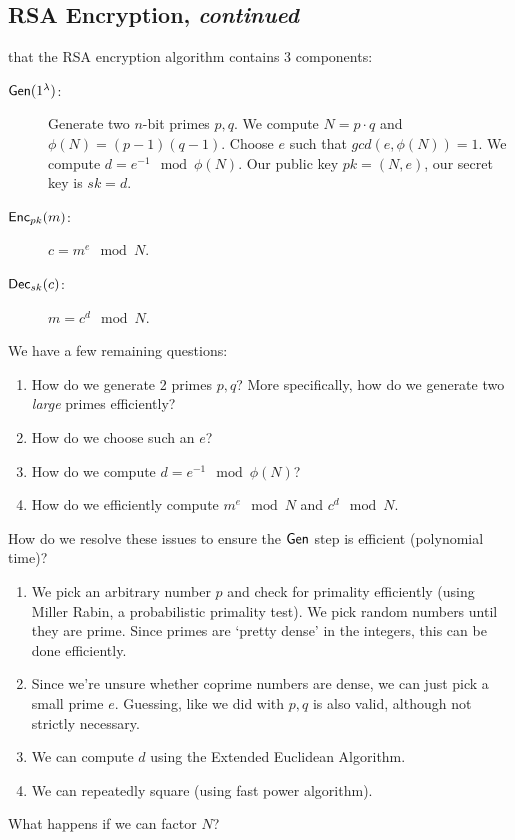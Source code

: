 \subsection{RSA Encryption, \emph{continued}}
\recall that the RSA encryption algorithm contains 3 components:
\begin{description}
    \item[$\operatorname{\mathsf{Gen}}(1^\lambda)$:] Generate two $n$-bit primes $p, q$. We compute $N = p\cdot q$ and $\phi(N) = (p-1)(q-1)$. Choose $e$ such that $gcd(e, \phi(N)) = 1$. We compute $d = e^{-1}\mod{\phi(N)}$. Our public key $pk = (N, e)$, our secret key is $sk = d$.
    \item[$\operatorname{\mathsf{Enc}}_{pk}(m)$:] $c = m^e\mod{N}$.
    \item[$\operatorname{\mathsf{Dec}}_{sk}(c)$:] $m = c^d\mod{N}$.
\end{description}
We have a few remaining questions:
\begin{enumerate}
    \item How do we generate 2 primes $p, q$? More specifically, how do we generate two \emph{large} primes efficiently?
    \item How do we choose such an $e$?
    \item How do we compute $d = e^{-1}\mod{\phi(N)}$?
    \item How do we efficiently compute $m^e\mod{N}$ and $c^d\mod N$.
\end{enumerate}
How do we resolve these issues to ensure the $\operatorname{\mathsf{Gen}}$ step is efficient (polynomial time)?
\begin{enumerate}
    \item We pick an arbitrary number $p$ and check for primality efficiently (using Miller Rabin, a probabilistic primality test). We pick random numbers until they are prime. Since primes are `pretty dense' in the integers, this can be done efficiently.
    \item Since we're unsure whether coprime numbers are dense, we can just pick a small prime $e$. Guessing, like we did with $p, q$ is also valid, although not strictly necessary.
    \item We can compute $d$ using the Extended Euclidean Algorithm.
    \item We can repeatedly square (using fast power algorithm).
\end{enumerate}

\begin{ques*}
    What happens if we can factor $N$?
\end{ques*}

